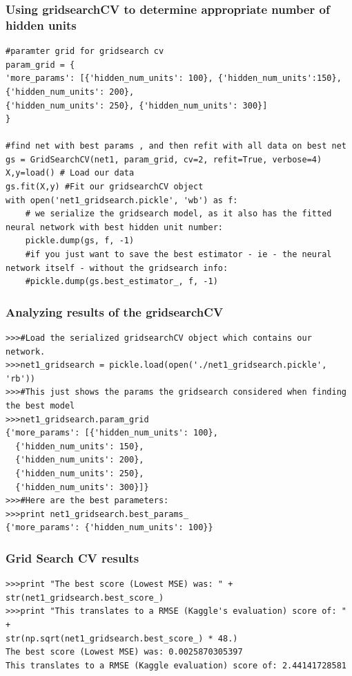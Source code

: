 \documentclass{beamer}
\begin{document}
\begin{frame}[fragile]
\frametitle{Using gridsearchCV to determine appropriate number of hidden units}
\begin{verbatim}
#paramter grid for gridsearch cv
param_grid = {
'more_params': [{'hidden_num_units': 100}, {'hidden_num_units':150}, {'hidden_num_units': 200},
{'hidden_num_units': 250}, {'hidden_num_units': 300}]
}
 
#find net with best params , and then refit with all data on best net
gs = GridSearchCV(net1, param_grid, cv=2, refit=True, verbose=4)
X,y=load() # Load our data
gs.fit(X,y) #Fit our gridsearchCV object
with open('net1_gridsearch.pickle', 'wb') as f:
    # we serialize the gridsearch model, as it also has the fitted neural network with best hidden unit number:
    pickle.dump(gs, f, -1)
    #if you just want to save the best estimator - ie - the neural network itself - without the gridsearch info:
    #pickle.dump(gs.best_estimator_, f, -1)
\end{verbatim}
\end{frame}

\begin{frame}[fragile]
\frametitle{Analyzing results of the gridsearchCV}
\begin{verbatim}
>>>#Load the serialized gridsearchCV object which contains our network.
>>>net1_gridsearch = pickle.load(open('./net1_gridsearch.pickle', 'rb'))
>>>#This just shows the params the gridsearch considered when finding the best model
>>>net1_gridsearch.param_grid
{'more_params': [{'hidden_num_units': 100},
  {'hidden_num_units': 150},
  {'hidden_num_units': 200},
  {'hidden_num_units': 250},
  {'hidden_num_units': 300}]}
>>>#Here are the best parameters:
>>>print net1_gridsearch.best_params_
{'more_params': {'hidden_num_units': 100}} 
\end{verbatim}
\end{frame}

\begin{frame}[fragile]
\frametitle{Grid Search CV results}
\begin{verbatim}
>>>print "The best score (Lowest MSE) was: " + str(net1_gridsearch.best_score_)
>>>print "This translates to a RMSE (Kaggle's evaluation) score of: " + 
str(np.sqrt(net1_gridsearch.best_score_) * 48.)
The best score (Lowest MSE) was: 0.0025870305397
This translates to a RMSE (Kaggle evaluation) score of: 2.44141728581
\end{verbatim}
\end{frame}
\end{document}

